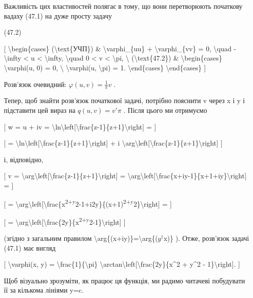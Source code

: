 \documentclass[
]{article}
\begin{document}
{Важливість цих властивостей полягає в тому, що вони перетворюють
початкову вадаху (47.1) на дуже просту задачу

(47.2)

{[} \textbackslash begin\{cases\} (\textbackslash text\{УЧП\}) \&
\textbackslash varphi\_\{uu\} + \textbackslash varphi\_\{vv\} = 0,
\textbackslash quad -\textbackslash infty \textless{} u \textless{}
\textbackslash infty, \textbackslash quad 0 \textless{} v \textless{}
\textbackslash pi, \textbackslash{} (\textbackslash text\{47.2\}) \&
\textbackslash begin\{cases\} \textbackslash varphi(u, 0) = 0,
\textbackslash{} \textbackslash varphi(u, \textbackslash pi) = 1.
\textbackslash end\{cases\} \textbackslash end\{cases\} {]}

Розв'язок очевидний: \(\varphi(u, v) = \frac{1}{\pi}v\) .

Тепер, щоб знайти розв'язок початкової задачі, потрібно пояснити v через
x і y і підставити цей вираз на \(q(u,v)=v'\pi\) . Після цього ми
отримуємо

{[} w = u + iv =
\textbackslash ln\textbackslash left{[}\textbackslash frac\{z-1\}\{z+1\}\textbackslash right{]}
= {]}

{[} =
\textbackslash ln\textbackslash left{[}\textbackslash frac\{z-1\}\{z+1\}\textbackslash right{]}
+ i
\textbackslash arg\textbackslash left{[}\textbackslash frac\{z-1\}\{z+1\}\textbackslash right{]}
{]}

і, відповідно,

{[} v =
\textbackslash arg\textbackslash left{[}\textbackslash frac\{z-1\}\{z+1\}\textbackslash right{]}
=
\textbackslash arg\textbackslash left{[}\textbackslash frac\{x+iy-1\}\{x+1+iy\}\textbackslash right{]}
= {]}

{[} =
\textbackslash arg\textbackslash left{[}\textbackslash frac\{x\textsuperscript{2+y}2-1+i2y\}\{(x+1)\textsuperscript{2+y}2\}\textbackslash right{]}
= {]}

{[} =
\textbackslash arg\textbackslash left{[}\textbackslash frac\{2y\}\{x\textsuperscript{2+y}2-1\}\textbackslash right{]}
{]}

(згідно з загальним правилом
\textbackslash arg\{(x+iy)\}=\textbackslash arg\{(\(y^{\dagger}\)x)\} ).
Отже, розв'язок задачі (47.1) має вигляд

{[} \textbackslash varphi(x, y) =
\textbackslash frac\{1\}\{\textbackslash pi\}
\textbackslash arctan\textbackslash left{[}\textbackslash frac\{2y\}\{x\^{}2
+ y\^{}2 - 1\}\textbackslash right{]}. {]}

Щоб візуально зрозуміти, як працює ця функція, ми радимо читачеві
побудувати її за кількома лініями y=c.

}
\end{document}
